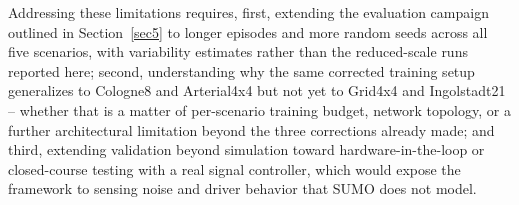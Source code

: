 \documentclass[3p,times]{elsarticle}
\theoremstyle{plain}
\theoremstyle{definition}
\begin{document}
Addressing these limitations requires, first, extending the evaluation
campaign outlined in Section~\ref{sec5} to longer episodes and more
random seeds across all five scenarios, with variability estimates
rather than the reduced-scale runs reported here; second,
understanding why the same corrected training setup generalizes to
Cologne8 and Arterial4x4 but not yet to Grid4x4 and Ingolstadt21 --
whether that is a matter of per-scenario training budget, network
topology, or a further architectural limitation beyond the three
corrections already made; and third, extending validation beyond
simulation toward hardware-in-the-loop or closed-course testing with a
real signal controller, which would expose the framework to sensing
noise and driver behavior that SUMO does not model.


\end{document}
